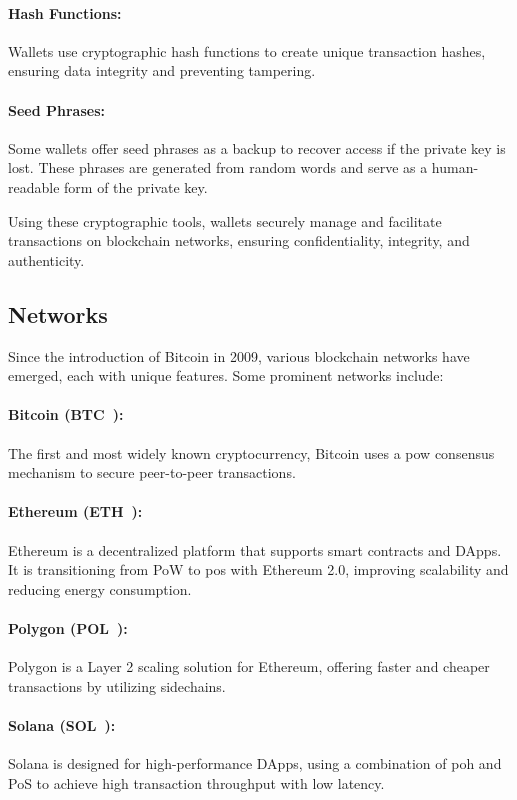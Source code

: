 \paragraph{Hash Functions:}
Wallets use cryptographic hash functions to create unique transaction hashes,
ensuring data integrity and preventing tampering.

\paragraph{Seed Phrases:}
Some wallets offer seed phrases as a backup to recover access if the private
key is lost. These phrases are generated from random words and serve as a
human-readable form of the private key.

Using these cryptographic tools, wallets securely manage and facilitate
transactions on blockchain networks, ensuring confidentiality, integrity, and
authenticity.

\subsection{Networks}\label{subsec:networks}

Since the introduction of Bitcoin in 2009, various blockchain networks have
emerged, each with unique features. Some prominent networks include:

\paragraph{Bitcoin (BTC~\cite{btc}):}
The first and most widely known cryptocurrency, Bitcoin uses a \gls{pow}
consensus mechanism to secure peer-to-peer transactions.

\paragraph{Ethereum (ETH~\cite{eth}):}
Ethereum is a decentralized platform that supports smart contracts and DApps.
It is transitioning from PoW to \gls{pos} with Ethereum 2.0, improving
scalability and reducing energy consumption.

\paragraph{Polygon (POL~\cite{pol}):}
Polygon is a Layer 2 scaling solution for Ethereum, offering faster and cheaper
transactions by utilizing sidechains.

\paragraph{Solana (SOL~\cite{sol}):}
Solana is designed for high-performance DApps, using a combination of \gls{poh}
and PoS to achieve high transaction throughput with low latency.

